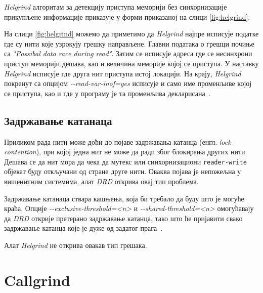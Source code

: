 \documentclass[12pt,oneside]{memoir}
\begin{document}
\indent \textit{Helgrind} алгоритам за детекцију приступа меморији без синхорнизације прикупљене информације приказује у форми приказаној на слици \ref{fig:helgrind}. 

\indent На слици \ref{fig:helgrind} можемо да приметимо да \textit{Helgrind} најпре исписује податке где су нити које узрокују грешку направљене. Главни података о грешци почиње са \textit{"Possibal data race during read"}. Затим се исписује адреса где се несинхрони приступ меморији дешава, као и величина меморије којој се приступа. У наставку \textit{Helgrind} исписује где друга нит приступа истој локацији. На крају, \textit{Helgrind} покренут са опцијом \textit{-\--read-var-inof=yes} исписује и само име променљиве којој се приступа, као и где у програму је та променљива декларисана~\cite{helgrindRef}.

\subsection{Задржавање катанаца}

\indent Приликом рада нити може доћи до појаве задржавања катанца (енгл. \textit{lock contention}), при којој једна нит не може да ради због блокирања других нити. Дешава се да нит мора да чека да мутекс или синхорнизациони \texttt{reader-write} објекат буду откључани од стране друге нити. Оваква појава је непожељна у вишенитним системима, алат \textit{DRD} открива овај тип проблема.

\indent Задржавање катанаца ствара кашњења, која би требало да буду што је могуће краћа. Опције \textit{-\--exclusive-threshold=<n>} и \textit{-\--shared-threshold=<n>} омогућавају да \textit{DRD} открије претерано задржавање катанца, тако што ће пријавити свако задржавање катанца које је дуже од задатог прага~\cite{drdRef}.

\indent Алат \textit{Helgrind} не открива овакав тип грешака.


\section{Callgrind}
\label{section_callgrind}
\end{document}
